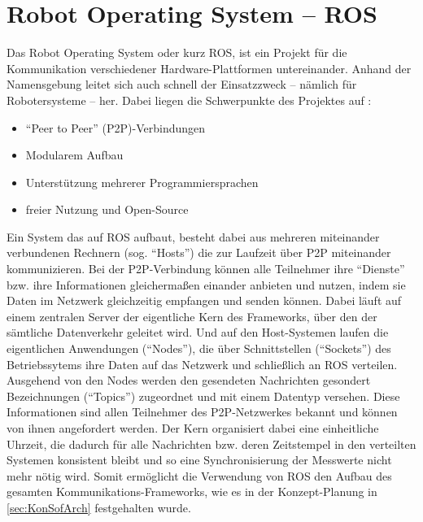 \documentclass[12pt,a4paper]{article}
\begin{document}
\section{Robot Operating System -- ROS}
Das Robot Operating System oder kurz ROS, ist ein Projekt für die Kommunikation verschiedener Hardware-Plattformen untereinander. Anhand der Namensgebung leitet sich auch schnell der Einsatzzweck -- nämlich für Robotersysteme -- her. Dabei liegen die Schwerpunkte des Projektes auf \cite{ROSPaper}:
\begin{itemize}
\item "`Peer to Peer"' (P2P)-Verbindungen
\item Modularem Aufbau
\item Unterstützung mehrerer Programmiersprachen
\item freier Nutzung und Open-Source
\end{itemize}
Ein System das auf ROS aufbaut, besteht dabei aus mehreren miteinander verbundenen Rechnern (sog. "`Hosts"') die zur Laufzeit über P2P miteinander kommunizieren. Bei der P2P-Verbindung können alle Teilnehmer ihre "`Dienste"' bzw. ihre Informationen gleichermaßen einander anbieten und nutzen, indem sie Daten im Netzwerk gleichzeitig empfangen und senden können. Dabei läuft auf einem zentralen Server der eigentliche Kern des Frameworks, über den der sämtliche Datenverkehr geleitet wird. Und auf den Host-Systemen laufen die eigentlichen Anwendungen ("`Nodes"'), die über Schnittstellen ("`Sockets"') des Betriebssytems ihre Daten auf das Netzwerk und schließlich an ROS verteilen. Ausgehend von den Nodes werden den gesendeten Nachrichten gesondert Bezeichnungen ("`Topics"') zugeordnet und mit einem Datentyp versehen. Diese Informationen sind allen Teilnehmer des P2P-Netzwerkes bekannt und können von ihnen angefordert werden. Der Kern organisiert dabei eine einheitliche Uhrzeit, die dadurch für alle Nachrichten bzw. deren Zeitstempel in den verteilten Systemen konsistent bleibt und so eine Synchronisierung der Messwerte nicht mehr nötig wird. Somit ermöglicht die Verwendung von ROS den Aufbau des gesamten Kommunikations-Frameworks, wie es in der Konzept-Planung in \ref{sec:KonSofArch} festgehalten wurde.
\end{document}
